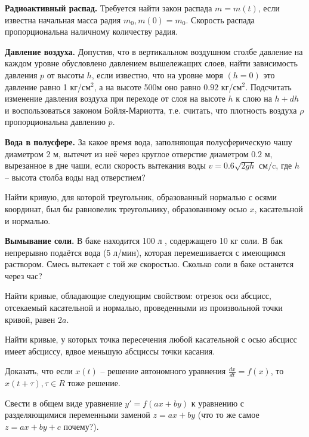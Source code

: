 \begin{task}
\textbf{Радиоактивный распад.} Требуется найти закон распада $m = m(t)$, если известна начальная масса радия $m_0, m(0)=m_0$. Скорость распада пропорциональна наличному количеству радия.
\end{task}


\begin{task}
\textbf{Давление воздуха.} Допустив, что в вертикальном воздушном столбе давление на каждом уровне обусловлено давлением вышележащих слоев, найти зависимость давления $p$ от высоты $h$, если известно, что на уровне моря $(h=0)$ это давление равно 1 кг/см$^2$, а на высоте 500м оно равно $0.92$ кг/см$^2$. Подсчитать изменение давления воздуха при переходе от слоя на высоте $h$  к слою на $h+dh$ и воспользоваться законом Бойля-Мариотта, т.е. считать, что плотность воздуха $\rho$ пропорциональна давлению $p$.
\end{task}

\begin{task}
    \textbf{Вода в полусфере.} За какое время вода, заполняющая полусферическую чашу диаметром 2 м, вытечет из неё через круглое отверстие диаметром $0.2$ м, вырезанное в дне чаши, если скорость вытекания воды $v=0.6\sqrt{2gh}$ см/c, где $h$ -- высота столба воды над отверстием?
\end{task}

\begin{task}
   Найти кривую, для которой треугольник, образованный нормалью с осями координат, был бы равновелик треугольнику, образованному осью $x$, касательной и нормалью.
\end{task}

\begin{task}
    \textbf{Вымывание соли.} В баке находится 100 л , содержащего 10 кг соли. В бак непрерывно подаётся вода (5 л/мин), которая перемешивается с имеющимся раствором. Смесь вытекает с той же скоростью. Сколько соли в баке останется через час?
\end{task}  


\begin{task}
Найти кривые, обладающие следующим свойством: отрезок оси абсцисс, отсекаемый касательной и нормалью, проведенными из произвольной точки кривой, равен $2a$.
\end{task}

\begin{task}
Найти кривые, у которых точка пересечения любой касательной с осью абсцисс имеет абсциссу, вдвое меньшую абсциссы точки касания.
\end{task}

\begin{task}
Доказать, что если $x(t)$ -- решение автономного уравнения $\frac{dx}{dt}=f(x)$, то $x(t+\tau), \tau \in R$ тоже решение.
\end{task}

\begin{task}
Свести в общем виде уравнение $y'=f(ax+by)$ к уравнению с разделяющимися переменными заменой $z=ax+by$ (что то же самое $z=ax+by+c$ почему?).
\end{task}
